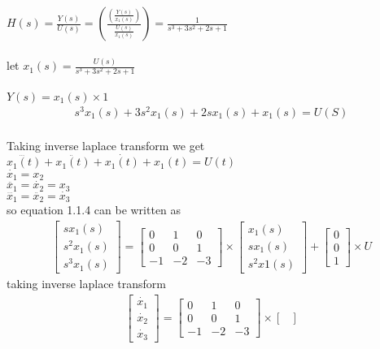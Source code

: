 \begin{enumerate}[label=\thesection.\arabic*.,ref=\thesection.\theenumi]
\\
\\ $H(s)=\frac{Y(s)}{U(s)}=(\frac{(\frac{Y(s)}{x_{1}(s)})}{\frac{U(s)}{x_{1}(s)}})=\frac{1}{s^3+3s^2+2s+1} $
\\
\\let   $x_{1}(s)=\frac{U(s)}{s^3+3s^2+2s+1}$
\\
\\$Y(s)=x_{1}(s)\times 1 $
\begin{align}
s^3x_{1}(s)+3s^2x_{1}(s)+2sx_{1}(s)+x_{1}(s)=U(S)
\end{align}
\\ Taking inverse laplace transform we get
\\$\dddot{x_{1}(t)}+\ddot{x_{1}(t)}+\dot{x_{1}(t)}+x_{1}(t)=U(t)$
\\$\dot{x_{1}}=x_{2}$
\\$\ddot{x_{1}}=\dot{x_{2}}=x_{3}$
\\$\dddot{x_{1}}=\ddot{x_{2}}=\dot{x_{3}}$
\\ so equation 1.1.4 can be written as
\\
\begin{gather}
\begin{bmatrix}
sx_{1}(s)\\
s^2x_{1}(s)\\
s^3x_{1}(s)
\end{bmatrix}
=
\begin{bmatrix}
0&1&0\\
0&0&1\\
-1&-2&-3
\end{bmatrix}\times \begin{bmatrix}
x_{1}(s)\\
sx_{1}(s)\\
s^2x{1}(s)
\end{bmatrix}
+
\begin{bmatrix}
0\\
0\\
1
\end{bmatrix} \times U
\end{gather}
taking inverse laplace transform
\begin{gather}
\begin{bmatrix}
\dot{x_{1}}\\
\dot{x_{2}}\\
\dot{x_{3}}
\end{bmatrix}
=
\begin{bmatrix}
0&1&0\\
0&0&1\\
-1&-2&-3
\end{bmatrix}\times \begin{bmatrix}

\end{bmatrix}
\end{gather}
\end{enumerate}
